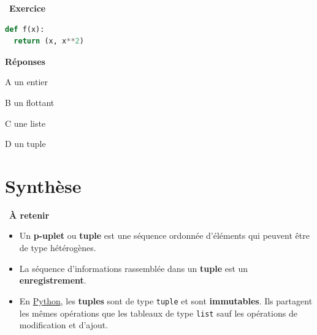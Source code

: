 \documentclass[
  11pt,
]{article}
\newcommand{\passthrough}[1]{#1}
\providecommand{\tightlist}{%
  \setlength{\itemsep}{0pt}\setlength{\parskip}{0pt}}
\newcounter{exo}
\newenvironment{exercice}[1]
{\par \medskip   \addtocounter{exo}{1} \noindent  
\begin{bclogo}[arrondi =0.1,   noborder = true, logo=\bccrayon, marge=4]{~\textbf{Exercice} \textbf{\theexo} {\itshape #1} }  \par}
{
\end{bclogo}
 \par \bigskip }
\newcounter{def}
\newenvironment{memo}[1]
{\par \medskip    \noindent  
\begin{bclogo}[arrondi =0.1,  ombre = true, barre=none, logo=\bccle, marge=4]{~\textbf{À retenir}  {\itshape #1} }  \par}
{
\end{bclogo}
 \par \bigskip }
\begin{document}
\begin{exercice}{}
\begin{lstlisting}[language=Python]
def f(x):
  return (x, x**2)
\end{lstlisting}

\textbf{Réponses}

A un entier

B un flottant

C une liste

D un tuple

\end{exercice}

\hypertarget{synthuxe8se}{%
\section{Synthèse}\label{synthuxe8se}}

\begin{memo}{}

\begin{itemize}
\tightlist
\item
  Un \textbf{p-uplet} ou \textbf{tuple} est une séquence ordonnée
  d'éléments qui peuvent être de type hétérogènes.
\item
  La séquence d'informations rassemblée dans un \textbf{tuple} est un
  \textbf{enregistrement}.
\item
  En
  \href{https://docs.python.org/3/tutorial/datastructures.html}{Python},
  les \textbf{tuples} sont de type \passthrough{\lstinline!tuple!} et
  sont \textbf{immutables}. Ils partagent les mêmes opérations que les
  tableaux de type \passthrough{\lstinline!list!} sauf les opérations de
  modification et d'ajout.
\end{itemize}

\end{memo}
\end{document}
